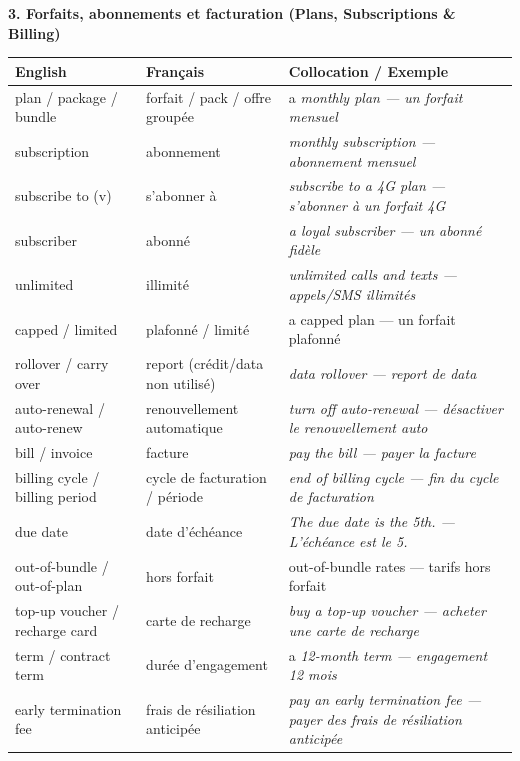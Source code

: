 \documentclass[11pt]{article}
\newcommand{\cle}[1]{{\popxbold\color{popdark}#1}}
\newcommand{\eng}[1]{\ifmmode\text{\textit{#1}}\else\begingroup\selectlanguage{english}\itshape #1\endgroup\fi}
\begin{document}
\textbf{3. Forfaits, abonnements et facturation (Plans, Subscriptions \& Billing)}
\begin{center}
\begin{tabularx}{\linewidth}{|X|X|X|}\hline
\rowcolor{poppurpleL} \textbf{English} & \textbf{Français} & \textbf{Collocation / Exemple} \\ \hline
\cle{plan} / \cle{package} / \cle{bundle} & forfait / pack / offre groupée & a \eng{monthly plan} — un forfait mensuel \\ \hline
\cle{subscription} & abonnement & \eng{monthly subscription} — abonnement mensuel \\ \hline
\cle{subscribe to} (v) & s'abonner à & \eng{subscribe to a 4G plan} — s'abonner à un forfait 4G \\ \hline
\cle{subscriber} & abonné & \eng{a loyal subscriber} — un abonné fidèle \\ \hline
\cle{unlimited} & illimité & \eng{unlimited calls and texts} — appels/SMS illimités \\ \hline
\cle{capped} / \cle{limited} & plafonné / limité & a \cle{capped plan} — un forfait plafonné \\ \hline
\cle{rollover} / \cle{carry over} & report (crédit/data non utilisé) & \eng{data rollover} — report de data \\ \hline
\cle{auto-renewal} / \cle{auto-renew} & renouvellement automatique & \eng{turn off auto-renewal} — désactiver le renouvellement auto \\ \hline
\cle{bill} / \cle{invoice} & facture & \eng{pay the bill} — payer la facture \\ \hline
\cle{billing cycle} / \cle{billing period} & cycle de facturation / période & \eng{end of billing cycle} — fin du cycle de facturation \\ \hline
\cle{due date} & date d'échéance & \eng{The due date is the 5th.} — L'échéance est le 5. \\ \hline
\cle{out-of-bundle} / \cle{out-of-plan} & hors forfait & \cle{out-of-bundle rates} — tarifs hors forfait \\ \hline
\cle{top-up voucher} / \cle{recharge card} & carte de recharge & \eng{buy a top-up voucher} — acheter une carte de recharge \\ \hline
\cle{term} / \cle{contract term} & durée d'engagement & a \eng{12-month term} — engagement 12 mois \\ \hline
\cle{early termination fee} & frais de résiliation anticipée & \eng{pay an early termination fee} — payer des frais de résiliation anticipée \\ \hline
\end{tabularx}
\end{center}
\end{document}
